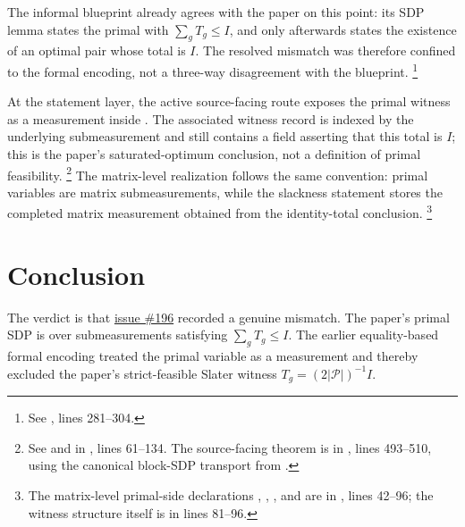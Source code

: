 \documentclass[11pt]{article}
\newcommand{\cP}{\mathcal P}
\begin{document}
The informal blueprint already agrees with the paper on this point: its SDP
lemma states the primal with $\sum_g T_g\le I$, and only afterwards states the
existence of an optimal pair whose total is $I$. The resolved mismatch was
therefore confined to the formal encoding, not a three-way disagreement with the
blueprint.
\footnote{See , lines
281--304.}

At the statement layer, the active source-facing route exposes the primal
witness as a measurement inside
. The associated witness record is
indexed by the underlying submeasurement and still contains a field
 asserting that this total is $I$; this is the
paper's saturated-optimum conclusion, not a definition of primal feasibility.
\footnote{See
 and
 in
, lines 61--134.
The source-facing theorem is
 in
,
lines 493--510, using the canonical block-SDP transport from
.}
The matrix-level realization follows the same convention: primal variables are
matrix submeasurements, while the slackness statement stores the completed
matrix measurement obtained from the identity-total conclusion.
\footnote{The matrix-level primal-side declarations
, ,
, and 
are in , lines
42--96; the witness structure itself is in lines 81--96.}

\section{Conclusion}

The verdict is that
\href{https://github.com/LionSR/MIPStarRE/issues/196}{issue \#196} recorded a
genuine mismatch. The paper's primal SDP is over submeasurements satisfying
$\sum_g T_g\le I$. The earlier equality-based formal encoding treated the
primal variable as a measurement and thereby excluded the paper's strict-feasible
Slater witness $T_g=(2|\cP|)^{-1}I$.
\end{document}
